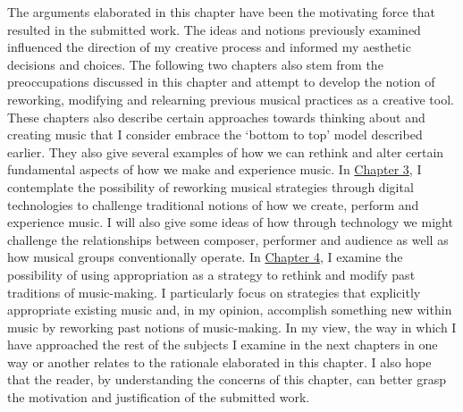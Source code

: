 The arguments elaborated in this chapter have been the motivating force that resulted in the submitted work. The ideas and notions previously examined influenced the direction of my creative process and informed my aesthetic decisions and choices. The following two chapters also stem from the preoccupations discussed in this chapter and attempt to develop the notion of reworking, modifying and relearning previous musical practices as a creative tool. These chapters also describe certain approaches towards thinking about and creating music that I consider embrace the `bottom to top' model described earlier. They also give several examples of how we can rethink and alter certain fundamental aspects of how we make and experience music. In \hyperlink{chapter3}{Chapter 3}, I contemplate the possibility of reworking musical strategies through digital technologies to challenge traditional notions of how we create, perform and experience music. I will also give some ideas of how through technology we might challenge the relationships between composer, performer and audience as well as how musical groups conventionally operate. In \hyperlink{chapter4}{Chapter 4}, I examine the possibility of using appropriation as a strategy to rethink and modify past traditions of music-making. I particularly focus on strategies that explicitly appropriate existing music and, in my opinion, accomplish something new within music by reworking past notions of music-making. In my view, the way in which I have approached the rest of the subjects I examine in the next chapters in one way or another relates to the rationale elaborated in this chapter. I also hope that the reader, by understanding the concerns of this chapter, can better grasp the motivation and justification of the submitted work.

\label{ch:motivation}